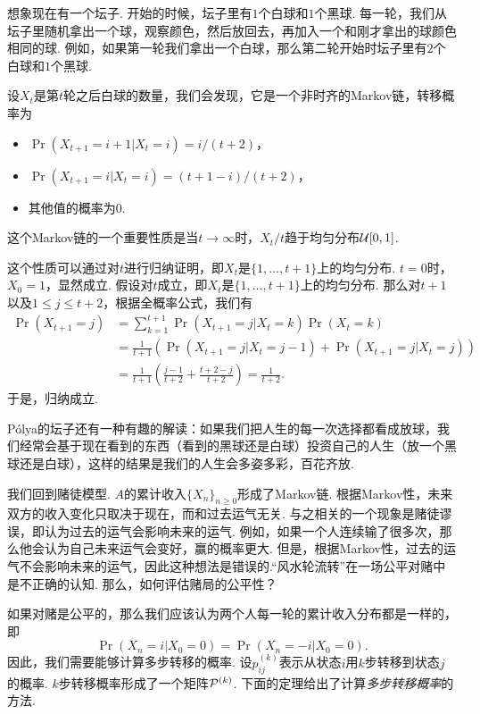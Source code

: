 \begin{example}[Pólya的坛子]
想象现在有一个坛子. 开始的时候，坛子里有$1$个白球和$1$个黑球. 每一轮，我们从坛子里随机拿出一个球，观察颜色，然后放回去，再加入一个和刚才拿出的球颜色相同的球. 例如，如果第一轮我们拿出一个白球，那么第二轮开始时坛子里有$2$个白球和$1$个黑球. 

设$X_t$是第$t$轮之后白球的数量，我们会发现，它是一个非时齐的Markov链，转移概率为
\begin{itemize}
    \item $\Pr(X_{t+1}=i+1|X_t=i)=i/(t+2)$，
    \item $\Pr(X_{t+1}=i|X_t=i)=(t+1-i)/(t+2)$，
    \item 其他值的概率为$0$. 
\end{itemize}
这个Markov链的一个重要性质是当$t\to\infty$时，$X_t/t$趋于均匀分布$\mathcal{U}[0,1]$. 

这个性质可以通过对$t$进行归纳证明，即$X_t$是$\{1,\dots,t+1\}$上的均匀分布. $t=0$时，$X_0=1$，显然成立. 假设对$t$成立，即$X_t$是$\{1,\dots,t+1\}$上的均匀分布. 那么对$t+1$以及$1\leq j\leq t+2$，根据全概率公式，我们有
\begin{align*}
    \Pr(X_{t+1}=j)&=\sum_{k=1}^{t+1}\Pr(X_{t+1}=j|X_t=k)\Pr(X_t=k)\\
    &=\frac{1}{t+1}(\Pr(X_{t+1}=j|X_t=j-1)+\Pr(X_{t+1}=j|X_t=j))\\
    &=\frac{1}{t+1}\left(\frac{j-1}{t+2}+\frac{t+2-j}{t+2}\right)=\frac{1}{t+2}.
\end{align*}
于是，归纳成立.

Pólya的坛子还有一种有趣的解读：如果我们把人生的每一次选择都看成放球，我们经常会基于现在看到的东西（看到的黑球还是白球）投资自己的人生（放一个黑球还是白球），这样的结果是我们的人生会多姿多彩，百花齐放. 
\end{example}

我们回到赌徒模型. $A$的累计收入$\{X_n\}_{n\geq 0}$形成了Markov链. 根据Markov性，未来双方的收入变化只取决于现在，而和过去运气无关. 与之相关的一个现象是赌徒谬误，即认为过去的运气会影响未来的运气. 例如，如果一个人连续输了很多次，那么他会认为自己未来运气会变好，赢的概率更大. 但是，根据Markov性，过去的运气不会影响未来的运气，因此这种想法是错误的.“风水轮流转”在一场公平对赌中是不正确的认知. 那么，如何评估赌局的公平性？

如果对赌是公平的，那么我们应该认为两个人每一轮的累计收入分布都是一样的，即
    \[\Pr(X_n=i|X_0=0)=\Pr(X_n=-i|X_0=0).\]
因此，我们需要能够计算多步转移的概率. 设$p_{ij}^{(k)}$表示从状态$i$用$k$步转移到状态$j$的概率. $k$步转移概率形成了一个矩阵$\mathcal P^{(k)}$. 下面的定理给出了计算\emph{多步转移概率}的方法.

